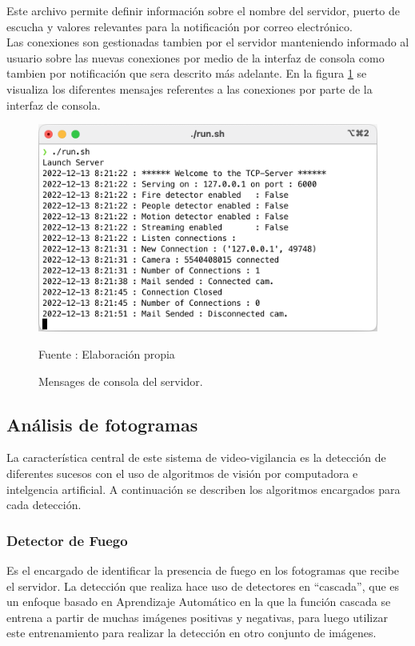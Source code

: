 Este archivo permite definir información sobre el nombre del servidor, puerto de escucha y valores relevantes para la notificación por correo electrónico.\\

Las conexiones son gestionadas tambien por el servidor manteniendo informado al usuario sobre las nuevas conexiones por medio de la interfaz de consola como tambien por notificación que sera descrito más adelante. En la figura \ref{fig:server_messages} se visualiza los diferentes mensajes referentes a las conexiones por parte de la interfaz de consola.\\

\begin{figure}[H]
    \begin{center}
        \includegraphics[width=12cm]{img/capitulo_5/server_messages.png}
    \end{center}
    \begin{center}
        \caption{Mensages de consola del servidor.}
        Fuente : Elaboración propia
        \label{fig:server_messages}
    \end{center}
\end{figure}

\subsection{Análisis de fotogramas}
La característica central de este sistema de video-vigilancia es la detección de diferentes sucesos con el uso de algoritmos de visión por computadora e intelgencia artificial. A continuación se describen los algoritmos encargados para cada detección.\\
\subsubsection{Detector de Fuego}
Es el encargado de identificar la presencia de fuego en los fotogramas que recibe el servidor. La detección que realiza hace uso de detectores en ``cascada'', que es un enfoque basado en Aprendizaje Automático en la que la función cascada se entrena a partir de muchas imágenes positivas y negativas, para luego utilizar este entrenamiento para realizar la detección en otro conjunto de imágenes.\\

